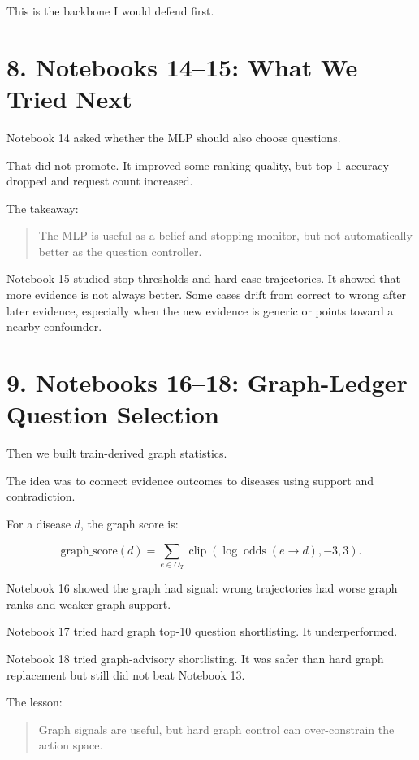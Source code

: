 \documentclass[11pt]{article}
\begin{document}
This is the backbone I would defend first.

\section*{8. Notebooks 14--15: What We Tried Next}

Notebook 14 asked whether the MLP should also choose questions.

That did not promote. It improved some ranking quality, but top-1 accuracy dropped and request count increased.

The takeaway:

\begin{quote}
The MLP is useful as a belief and stopping monitor, but not automatically better as the question controller.
\end{quote}

Notebook 15 studied stop thresholds and hard-case trajectories. It showed that more evidence is not always better. Some cases drift from correct to wrong after later evidence, especially when the new evidence is generic or points toward a nearby confounder.

\section*{9. Notebooks 16--18: Graph-Ledger Question Selection}

Then we built train-derived graph statistics.

The idea was to connect evidence outcomes to diseases using support and contradiction.

For a disease $d$, the graph score is:

\[
\text{graph\_score}(d)=
\sum_{e\in O_T}\operatorname{clip}(\log \operatorname{odds}(e\rightarrow d),-3,3).
\]

Notebook 16 showed the graph had signal: wrong trajectories had worse graph ranks and weaker graph support.

Notebook 17 tried hard graph top-10 question shortlisting. It underperformed.

Notebook 18 tried graph-advisory shortlisting. It was safer than hard graph replacement but still did not beat Notebook 13.

The lesson:

\begin{quote}
Graph signals are useful, but hard graph control can over-constrain the action space.
\end{quote}
\end{document}

